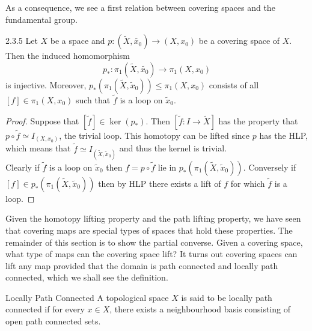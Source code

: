 \documentclass[a4paper]{article}
\begin{document}
As a consequence, we see a first relation between covering spaces and the fundamental group. 

\begin{prp}{}{2.3.5} Let $X$ be a space and $p:(\widetilde{X},\widetilde{x_0})\to(X,x_0)$ be a covering space of $X$. Then the induced homomorphism $$p_\ast:\pi_1(\widetilde{X},\widetilde{x_0})\to\pi_1(X,x_0)$$ is injective. Moreover, $p_\ast(\pi_1(\widetilde{X},\widetilde{x}_0))\leq\pi_1(X,x_0)$ consists of all $[f]\in\pi_1(X,x_0)$ such that $\widetilde{f}$ is a loop on $\widetilde{x}_0$. 
\begin{proof}
Suppose that $[\widetilde{f}]\in\ker(p_\ast)$. Then $[\widetilde{f}:I\to\widetilde{X}]$ has the property that $p\circ\widetilde{f}\simeq I_{(X,x_0)}$, the trivial loop. This homotopy can be lifted since $p$ has the HLP, which means that $\widetilde{f}\simeq I_{(\widetilde{X},\widetilde{x}_0)}$ and thus the kernel is trivial. \\
Clearly if $\widetilde{f}$ is a loop on $\widetilde{x}_0$ then $f=p\circ\widetilde{f}$ lie in $p_\ast(\pi_1(\widetilde{X},\widetilde{x}_0))$. Conversely if $[f]\in p_\ast(\pi_1(\widetilde{X},\widetilde{x}_0))$ then by HLP there exists a lift of $f$ for which $\widetilde{f}$ is a loop. 
\end{proof}
\end{prp}

Given the homotopy lifting property and the path lifting property, we have seen that covering maps are special types of spaces that hold these properties. The remainder of this section is to show the partial converse. Given a covering space, what type of maps can the covering space lift? It turns out covering spaces can lift any map provided that the domain is path connected and locally path connected, which we shall see the definition. 

\begin{defn}{Locally Path Connected}{} A topological space $X$ is said to be locally path connected if for every $x\in X$, there exists a neighbourhood basis consisting of open path connected sets. 
\end{defn}
\end{document}
